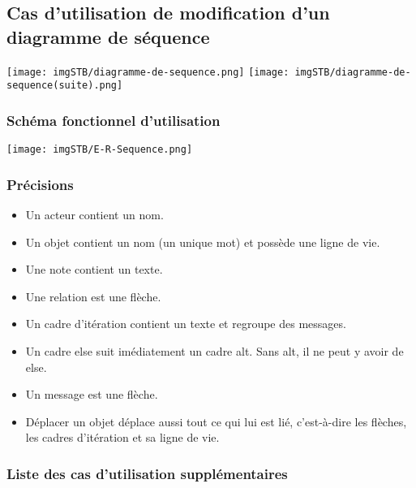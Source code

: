 \documentclass[hidelinks, 10pt,a4paper]{article}
\begin{document}
\newpage

\subsection{Cas d’utilisation de modification d’un diagramme de séquence}
\begin{center}
    \texttt{[image: imgSTB/diagramme-de-sequence.png]}
    \texttt{[image: imgSTB/diagramme-de-sequence(suite).png]}
\end{center}
\subsubsection{Schéma fonctionnel d’utilisation}
\begin{center}
    \texttt{[image: imgSTB/E-R-Sequence.png]}
\end{center}


\subsubsection{Précisions}
\begin{itemize}
 \item Un acteur contient un nom.
 \item Un objet contient un nom (un unique mot) et possède une ligne de vie.
 \item Une note contient un texte.
 \item Une relation est une flèche.
 \item Un cadre d’itération contient un texte et regroupe des messages.
 \item Un cadre else suit imédiatement un cadre alt. Sans alt, il ne peut y avoir de else.
 \item Un message est une flèche.
 \item Déplacer un objet déplace aussi tout ce qui lui est lié, c’est-à-dire les flèches, les cadres d’itération et sa ligne de vie.
\end{itemize}

\subsubsection{Liste des cas d’utilisation supplémentaires}
\end{document}
